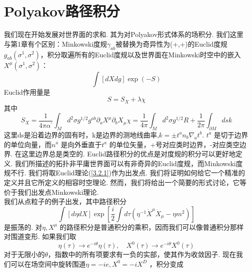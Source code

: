 \section{Polyakov路径积分}%

我们现在开始发展对世界面的求和. 其为对Polyakov形式体系的场积分. 我们这里与第1章有个区别：Minkowski度规$\gamma_{ab}$被替换为奇异性为(+,+)的Euclid度规$g_{a b}\left(\sigma^{1}, \sigma^{2}\right)$，积分取遍所有的Euclid度规以及世界面在Minkowski时空中的嵌入$X^{\mu}\left(\sigma^{1}, \sigma^{2}\right)$：
\begin{equation}\label{3.2.1}
\int[d X d g] \exp (-S)
\end{equation}
Euclid作用量是
\begin{equation}
S=S_{X}+\lambda \chi
\end{equation}
其中
\begin{subequations}\label{3.2.3}
\begin{equation}
S_{X}=\frac{1}{4 \pi \alpha^{\prime}} \int_{M} d^{2} \sigma g^{1 / 2} g^{a b} \partial_{a} X^{\mu} \partial_{b} X_{\mu}
\end{equation}
\begin{equation}
\chi=\frac{1}{4 \pi} \int_{M} d^{2} \sigma g^{1 / 2} R+\frac{1}{2 \pi} \int_{\partial M} d s k
\end{equation}
\end{subequations}
这里ds是沿着边界的固有时，k是边界的测地线曲率,$k=\pm t^{a} n_{b} \nabla_{a} t^{b}$.
$t^a$ 是切于边界的单位向量，而$n^a$ 是向外垂直于$t^a$ 的单位矢量，+号对应类时边界，-对应类空边界. 在这里边界总是类空的. Euclid路径积分的优点是对度规的积分可以更好地定义. 我们所描述的拓扑非平庸世界面可以有非奇异的Euclid度规，而Minkowski度规不行. 我们将取Euclid理论(\ref{3.2.1})作为出发点. 我们将证明如何给它一个精准的定义并且它所定义的相容时空理论. 然而，我们将给出一个简要的形式讨论，它等价于我们出发点Minkowski理论. \\
我们从点粒子的例子出发，其中路径积分
\begin{equation}
\int[d \eta d X] \exp \left[\frac{i}{2} \int d \tau\left(\eta^{-1} \dot{X}^{\mu} \dot{X}_{\mu}-\eta m^{2}\right)\right]
\end{equation}
是振荡的. 对$\eta, X^\mu$ 的路径积分是普通积分的乘积，因而我们可以像普通积分那样对围道变形. 如果我们取
\begin{equation}
\eta(\tau) \rightarrow e^{-i \theta} \eta(\tau), \quad X^{0}(\tau) \rightarrow e^{-i \theta} X^{0}(\tau)
\end{equation}
对于无限小的$\theta$，指数中的所有项要求有一负的实部，使其作为收敛因子. 现在我们可以在场空间中旋转围道$\eta=-i e, X^{0}=-i X^{D}$ ，积分变成
